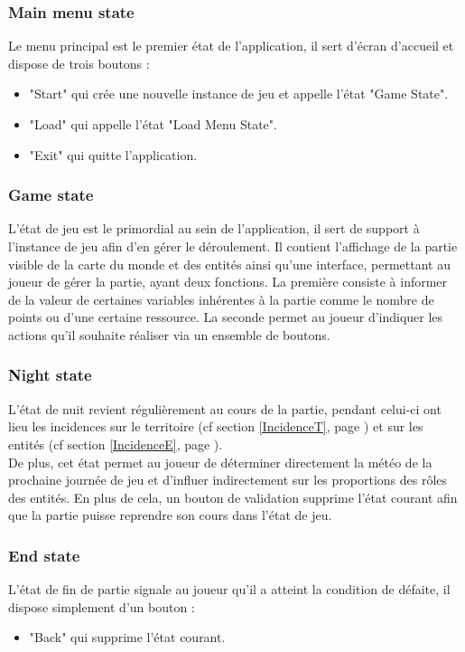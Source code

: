 \documentclass[a4paper]{memoir}
\begin{document}
				\subsubsection{Main menu state}
					Le menu principal est le premier état de l’application, il sert d’écran d’accueil et dispose de trois boutons :
					\begin{itemize}[label=$\bullet$]
						\item "Start" qui crée une nouvelle instance de jeu et appelle l’état "Game State".
						\item "Load" qui appelle l’état "Load Menu State".
						\item "Exit" qui quitte l’application.
					\end{itemize}
					
				\subsubsection{Game state}
					L’état de jeu est le primordial au sein de l’application, il sert de support à l’instance de jeu afin d’en gérer le déroulement. Il contient l’affichage de la partie visible de la carte du monde et des entités ainsi qu’une interface, permettant au joueur de gérer la partie, ayant deux fonctions. La première consiste à informer de la valeur de certaines variables inhérentes à la partie comme le nombre de points ou d’une certaine ressource. La seconde permet au joueur d’indiquer les actions qu’il souhaite réaliser via un ensemble de boutons.
					
				\subsubsection{Night state}
					L’état de nuit revient régulièrement au cours de la partie, pendant celui-ci ont lieu les incidences sur le territoire (cf section \ref{IncidenceT}, page \pageref{IncidenceT}) et sur les entités (cf    section \ref{IncidenceE}, page \pageref{IncidenceE}).\\
					De plus, cet état permet au joueur de déterminer directement la météo de la prochaine journée de jeu et d’influer indirectement sur les proportions des rôles des entités. En plus de cela, un bouton de validation supprime l’état courant afin que la partie puisse reprendre son cours dans l’état de jeu.
					
				\subsubsection{End state}
					L’état de fin de partie signale au joueur qu’il a atteint la condition de défaite, il dispose simplement d’un bouton :
					\begin{itemize}[label=$\bullet$]
						\item "Back" qui supprime l’état courant.
					\end{itemize}
					
\end{document}
